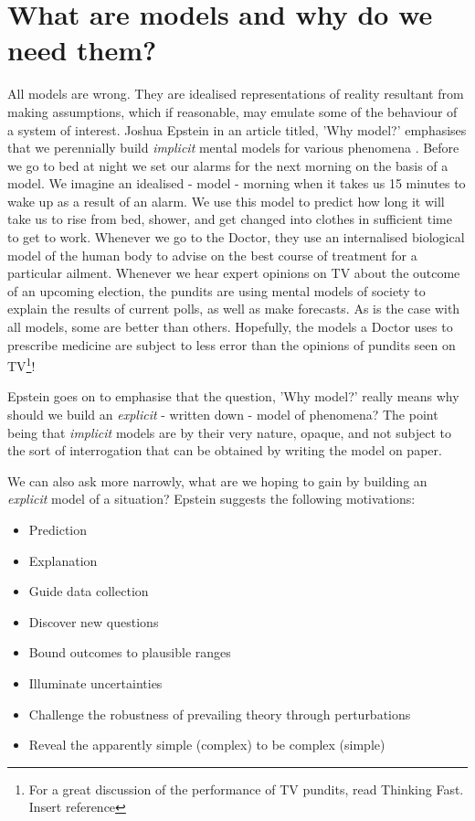 \documentclass[11pt,fullpage]{book}
\begin{document}
\section{What are models and why do we need them?}
All models are wrong. They are idealised representations of reality resultant from making assumptions, which if reasonable, may emulate some of the behaviour of a system of interest. Joshua Epstein in an article titled, 'Why model?' emphasises that we perennially build \textit{implicit} mental models for various phenomena \cite{epstein2008model}. Before we go to bed at night we set our alarms for the next morning on the basis of a model. We imagine an idealised - model - morning when it takes us 15 minutes to wake up as a result of an alarm. We use this model to predict how long it will take us to rise from bed, shower, and get changed into clothes in sufficient time to get to work. Whenever we go to the Doctor, they use an internalised biological model of the human body to advise on the best course of treatment for a particular ailment. Whenever we hear expert opinions on TV about the outcome of an upcoming election, the pundits are using mental models of society to explain the results of current polls, as well as make forecasts. As is the case with all models, some are better than others. Hopefully, the models a Doctor uses to prescribe medicine are subject to less error than the opinions of pundits seen on TV\footnote{For a great discussion of the performance of TV pundits, read Thinking Fast. Insert reference}! 

Epstein goes on to emphasise that the question, 'Why model?' really means why should we build an \textit{explicit} - written down - model of phenomena? The point being that \textit{implicit} models are by their very nature, opaque, and not subject to the sort of interrogation that can be obtained by writing the model on paper. 

We can also ask more narrowly, what are we hoping to gain by building an \textit{explicit} model of a situation? Epstein suggests the following motivations:

\begin{itemize}
\item Prediction
\item Explanation
\item Guide data collection
\item Discover new questions
\item Bound outcomes to plausible ranges
\item Illuminate uncertainties
\item Challenge the robustness of prevailing theory through perturbations
\item Reveal the apparently simple (complex) to be complex (simple) 
\end{itemize}
\end{document}
